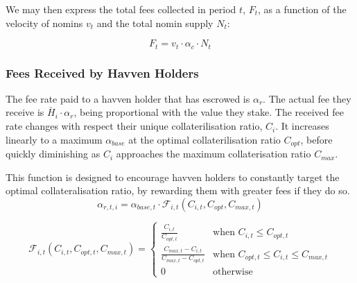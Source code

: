 \noindent We may then express the total fees collected in period $t$, $F_t$, as a function
of the velocity of nomins $v_t$ and the total nomin supply $N_t$:

\begin{equation}
    F_t = v_t \cdot \alpha_c \cdot N_t
\end{equation}

\newpage
\subsubsection{Fees Received by Havven Holders}

\noindent The fee rate paid to a havven holder that has escrowed is $\alpha_r$.
The actual fee they receive is $\check{H_i} \cdot \alpha_r$, being proportional with the value they stake.
The received fee rate changes with respect their unique collaterilisation ratio, $C_i$.
It increases linearly to a maximum $\alpha_{base}$ at the optimal collaterilisation ratio $C_{opt}$, before quickly
diminishing as $C_i$ approaches the maximum collaterisation ratio $C_{max}$. 

\noindent This function is designed to encourage havven holders to constantly
target the optimal collateralisation ratio, by rewarding them with greater
fees if they do so.\\



\begin{equation}
\alpha_{r,t,i} = \alpha_{base,t} \cdot \mathcal{F}_{i,t}(C_{i,t}, C_{opt}, C_{max,t})  \label{eq:feesreceived}
\end{equation}

\begin{equation}
\mathcal{F}_{i,t}(C_{i,t}, C_{opt,t}, C_{max,t}) = 
\begin{cases}
 \frac{C_{i,t}}{C_{opt,t}} &\mbox{when } C_{i,t} \leq C_{opt,t} \\[1em]
 \frac{C_{max,t} - C_{i,t}}{C_{max,t} - C_{opt,t}} &\mbox{when } C_{opt,t} \leq C_{i,t} \leq C_{max,t} \\[1em]
 0 &\mbox{otherwise}
 \end{cases}
 \label{eq:7}
\end{equation}

